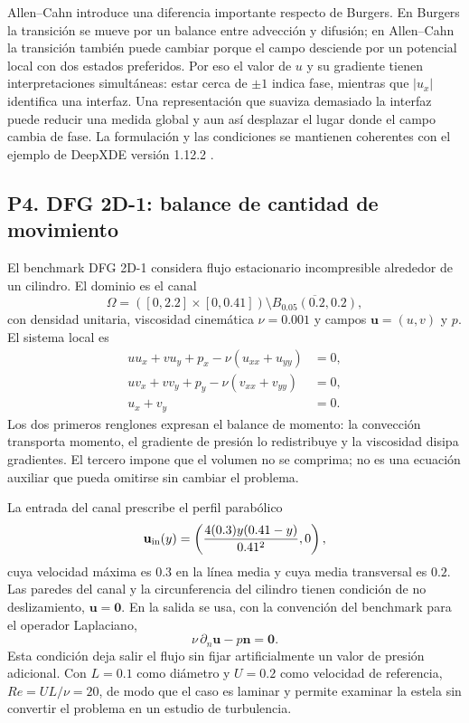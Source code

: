Allen--Cahn introduce una diferencia importante respecto de Burgers. En
Burgers la transición se mueve por un balance entre advección y difusión; en
Allen--Cahn la transición también puede cambiar porque el campo desciende por
un potencial local con dos estados preferidos. Por eso el valor de $u$ y su
gradiente tienen interpretaciones simultáneas: estar cerca de $\pm1$ indica
fase, mientras que $|u_x|$ identifica una interfaz. Una representación que
suaviza demasiado la interfaz puede reducir una medida global y aun así
desplazar el lugar donde el campo cambia de fase. La formulación y las
condiciones se mantienen coherentes con el ejemplo de DeepXDE versión 1.12.2
\cite{deepxdeAC}.

\subsection{P4. DFG 2D-1: balance de cantidad de movimiento}

El benchmark DFG 2D-1 considera flujo estacionario incompresible alrededor de
un cilindro. El dominio es el canal
\begin{equation}
\Omega=([0,2.2]\times[0,0.41])
\setminus\overline{B_{0.05}(0.2,0.2)},
\label{eq:expansion-p4-domain}
\end{equation}
con densidad unitaria, viscosidad cinemática $\nu=0.001$ y campos
$\mathbf u=(u,v)$ y $p$. El sistema local es
\begin{align}
u u_x+v u_y+p_x-\nu(u_{xx}+u_{yy})&=0,\\
u v_x+v v_y+p_y-\nu(v_{xx}+v_{yy})&=0,\\
u_x+v_y&=0.
\label{eq:expansion-p4-ns}
\end{align}
Los dos primeros renglones expresan el balance de momento: la convección
transporta momento, el gradiente de presión lo redistribuye y la viscosidad
disipa gradientes. El tercero impone que el volumen no se comprima; no es una
ecuación auxiliar que pueda omitirse sin cambiar el problema.

La entrada del canal prescribe el perfil parabólico
\begin{equation}
\mathbf u_{\rm in}(y)=
\left(\frac{4(0.3)y(0.41-y)}{0.41^2},0\right),
\label{eq:expansion-p4-inlet}
\end{equation}
cuya velocidad máxima es $0.3$ en la línea media y cuya media transversal
es $0.2$. Las paredes del canal y la circunferencia del cilindro tienen
condición de no deslizamiento, $\mathbf u=\mathbf0$. En la salida se usa,
con la convención del benchmark para el operador Laplaciano,
\begin{equation}
\nu\,\partial_n\mathbf u-p\mathbf n=\mathbf0.
\label{eq:expansion-p4-outlet}
\end{equation}
Esta condición deja salir el flujo sin fijar artificialmente un valor de
presión adicional. Con $L=0.1$ como diámetro y $U=0.2$ como velocidad de
referencia, $Re=UL/\nu=20$, de modo que el caso es laminar y permite
examinar la estela sin convertir el problema en un estudio de turbulencia.


